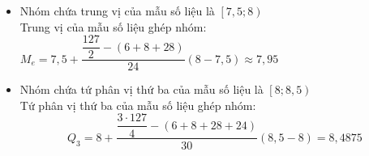 \begin{bt}
{\begin{itemize}
			$${{M}_{0}}=8+\dfrac{30-24}{\left( 30-24 \right)+\left( 30-12 \right)}\left( 8{,}5-8 \right)=8{,}125$$ 
			 \item
			Nhóm chứa trung vị của mẫu số liệu  là $\left[7{,}5;8 \right)$\\
			Trung  vị của mẫu số liệu ghép nhóm:
			${{M}_{e}}=7{,}5+\dfrac{\dfrac{127}{2}-\left( 6+8+28 \right)}{24}\left( 8-7{,}5 \right)\approx 7{,}95$ 
			\item Nhóm chứa tứ phân vị thứ ba của  mẫu số liệu là $\left[8;8{,}5 \right)$\\
			Tứ phân vị thứ ba của mẫu số liệu ghép  nhóm:
			 $${{Q}_{3}}=8+\dfrac{\dfrac{3\cdot127}{4}-\left( 6+8+28+24 \right)}{30}\left( 8{,}5-8 \right)=8{,}4875$$
		\end{itemize}
	} 
\end{bt}

